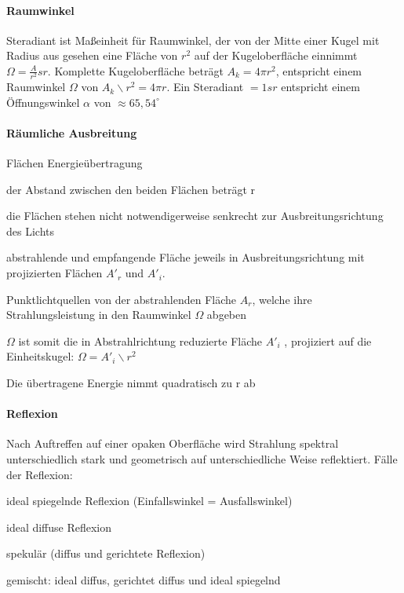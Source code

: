 \documentclass[landscape]{article}
\begin{document}
\begin{multicols}{3}
  \paragraph{Raumwinkel}
  Steradiant ist Maßeinheit für Raumwinkel, der von der Mitte einer Kugel mit Radius aus gesehen eine Fläche von $r^2$ auf der Kugeloberfläche einnimmt $\Omega=\frac{A}{r^2}sr$.
  Komplette Kugeloberfläche beträgt $A_k = 4\pi r^2$, entspricht einem Raumwinkel $\Omega$ von $A_k\backslash r^2= 4\pi r$. Ein Steradiant $=1sr$ entspricht einem Öffnungswinkel $\alpha$ von $\approx 65,54^{\circ}$
  
  \paragraph{Räumliche Ausbreitung}
  Flächen Energieübertragung
  \begin{itemize*}
    \item der Abstand zwischen den beiden Flächen beträgt r
    \item die Flächen stehen nicht notwendigerweise senkrecht zur Ausbreitungsrichtung des Lichts
    \item abstrahlende und empfangende Fläche jeweils in Ausbreitungsrichtung mit projizierten Flächen $A'_r$ und $A'_i$.
    \item Punktlichtquellen von der abstrahlenden Fläche $A_r$, welche ihre Strahlungsleistung in den Raumwinkel $\Omega$ abgeben
    \item $\Omega$ ist somit die in Abstrahlrichtung reduzierte Fläche $A'_i$ , projiziert auf die Einheitskugel: $\Omega=A'_i \backslash r^2$
    \item Die übertragene Energie nimmt quadratisch zu r ab
  \end{itemize*}
  
  \paragraph{Reflexion}
  Nach Auftreffen auf einer opaken Oberfläche wird Strahlung spektral unterschiedlich stark und geometrisch auf unterschiedliche Weise reflektiert. 
  Fälle der Reflexion:
  \begin{itemize*}
    \item ideal spiegelnde Reflexion (Einfallswinkel = Ausfallswinkel)
    \item ideal diffuse Reflexion
    \item spekulär (diffus und gerichtete Reflexion)
    \item gemischt: ideal diffus, gerichtet diffus und ideal spiegelnd
  \end{itemize*}
  

\end{multicols}
\end{document}
